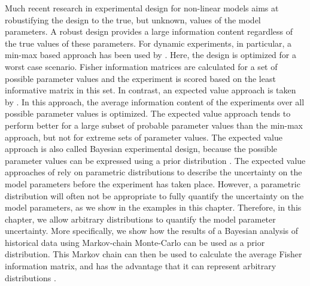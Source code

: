 Much recent research in experimental design for non-linear models aims at robustifying the design to the true, but unknown, values of the model parameters. A robust design provides a large information content regardless of the true values of these parameters. For dynamic experiments, in particular, a min-max based approach has been used by \textcite{bauer, korkel}. Here, the design is optimized for a worst case scenario. Fisher information matrices are calculated for a set of possible parameter values and the experiment is scored based on the least informative matrix in this set. In contrast, an expected value approach is taken by \textcite{schenkendorf, telen, nimmegeers}. In this approach, the average information content of the experiments over all possible parameter values is optimized. The expected value approach tends to perform better for a large subset of probable parameter values than the min-max approach, but not for extreme sets of parameter values. The expected value approach is also called Bayesian experimental design, because the possible parameter values can be expressed using a prior distribution \parencite{chaloner}. The expected value approaches of \textcite{telen, nimmegeers} rely on  parametric distributions to describe the uncertainty on the model parameters before the experiment has taken place. However, a parametric distribution will often not be appropriate to fully quantify the uncertainty on the model parameters, {\color{red}as we show in the examples in this chapter}. Therefore, in this chapter, we allow arbitrary distributions to quantify the model parameter uncertainty. More specifically, we show how the results of a Bayesian analysis of historical data using Markov-chain Monte-Carlo can be used as a prior distribution. This Markov chain can then be used to calculate the average Fisher information matrix, and has the advantage that it can represent arbitrary distributions \parencite{gelman}.               
\\
\\
